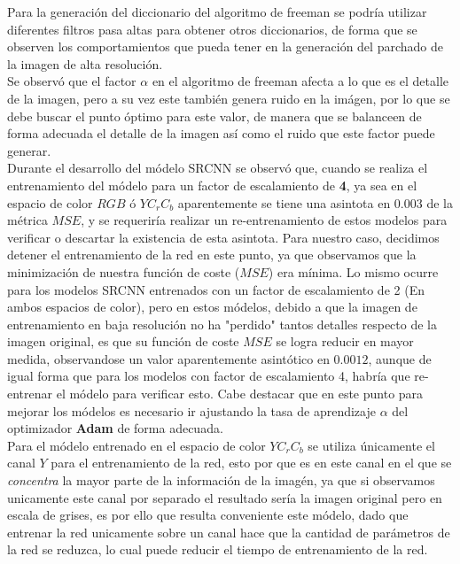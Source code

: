 Para la generación del diccionario del algoritmo de freeman se podría utilizar diferentes filtros pasa altas para obtener otros
diccionarios, de forma que se observen los comportamientos que pueda tener en la generación del parchado de la imagen de
alta resolución.\\
Se observó que el factor $\alpha$ en el algoritmo de freeman afecta a lo que es el detalle de la imagen, pero a su vez este también genera ruido en la imágen,
por lo que se debe buscar el punto óptimo para este valor, de manera que se balanceen de forma adecuada el detalle de la imagen
así como el ruido que este factor puede generar.\\
Durante el desarrollo del módelo SRCNN se observó que, cuando se realiza el entrenamiento del módelo para un factor de escalamiento
de \textbf{4}, ya sea en el espacio de color $RGB$ ó $YC_rC_b$ aparentemente se tiene una asintota en $0.003$ de la métrica $MSE$,
y se requeriría realizar un re-entrenamiento de estos modelos para verificar o descartar la existencia de esta asintota. Para
nuestro caso, decidimos detener el entrenamiento de la red en este punto, ya que observamos que la minimización de nuestra función
de coste ($MSE$) era mínima. Lo mismo ocurre para los modelos SRCNN entrenados con un factor de escalamiento de 2 (En ambos
espacios de color), pero en estos módelos, debido a que la imagen de entrenamiento en baja resolución no ha "perdido" tantos
detalles respecto de la imagen original, es que su función de coste $MSE$ se logra reducir en mayor medida, observandose un valor
aparentemente asintótico en $0.0012$, aunque de igual forma que para los modelos con factor de escalamiento 4, habría que re-entrenar
el módelo para verificar esto. Cabe destacar que en este punto para mejorar los módelos es necesario ir ajustando la tasa de aprendizaje
$\alpha$ del optimizador \textbf{Adam} de forma adecuada.\\
Para el módelo entrenado en el espacio de color $YC_rC_b$ se utiliza únicamente el canal $Y$ para el entrenamiento de la red,
esto por que es en este canal en el que se \emph{concentra} la mayor parte de la información de la imagén, ya que si observamos
unicamente este canal por separado el resultado sería la imagen original pero en escala de grises, es por ello que resulta conveniente
este módelo, dado que entrenar la red unicamente sobre un canal hace que la cantidad de parámetros de la red se reduzca, lo cual
puede reducir el tiempo de entrenamiento de la red.